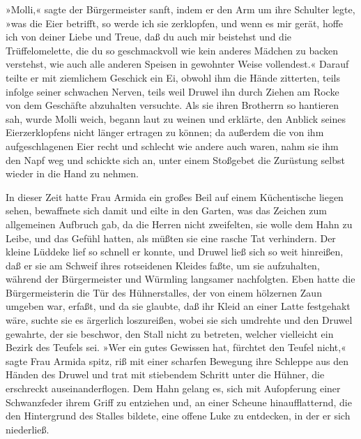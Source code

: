 »Molli,« sagte der Bürgermeister sanft, indem er den Arm um ihre
Schulter legte, »was die Eier betrifft, so werde ich sie
zerklopfen, und wenn es mir gerät, hoffe ich von deiner Liebe und
Treue, daß du auch mir beistehst und die Trüffelomelette, die du so
geschmackvoll wie kein anderes Mädchen zu backen verstehst, wie
auch alle anderen Speisen in gewohnter Weise vollendest.« Darauf
teilte er mit ziemlichem Geschick ein Ei, obwohl ihm die Hände
zitterten, teils infolge seiner schwachen Nerven, teils weil Druwel
ihn durch Ziehen am Rocke von dem Geschäfte abzuhalten versuchte.
Als sie ihren Brotherrn so hantieren sah, wurde Molli weich, begann
laut zu weinen und erklärte, den Anblick seines Eierzerklopfens
nicht länger ertragen zu können; da außerdem die von ihm
aufgeschlagenen Eier recht und schlecht wie andere auch waren, nahm
sie ihm den Napf weg und schickte sich an, unter einem Stoßgebet
die Zurüstung selbst wieder in die Hand zu nehmen.

In dieser Zeit hatte Frau Armida ein großes Beil auf einem
Küchentische liegen sehen, bewaffnete sich damit und eilte in den
Garten, was das Zeichen zum allgemeinen Aufbruch gab, da die Herren
nicht zweifelten, sie wolle dem Hahn zu Leibe, und das Gefühl
hatten, als müßten sie eine rasche Tat verhindern. Der kleine
Lüddeke lief so schnell er konnte, und Druwel ließ sich so weit
hinreißen, daß er sie am Schweif ihres rotseidenen Kleides faßte,
um sie\pagenum{[17]} aufzuhalten, während der Bürgermeister und
Würmling langsamer nachfolgten. Eben hatte die Bürgermeisterin die
Tür des Hühnerstalles, der von einem hölzernen Zaun umgeben war,
erfaßt, und da sie glaubte, daß ihr Kleid an einer Latte festgehakt
wäre, suchte sie es ärgerlich loszureißen, wobei sie sich umdrehte
und den Druwel gewahrte, der sie beschwor, den Stall nicht zu
betreten, welcher vielleicht ein Bezirk des Teufels sei. »Wer ein
gutes Gewissen hat, fürchtet den Teufel nicht,« sagte Frau Armida
spitz, riß mit einer scharfen Bewegung ihre Schleppe aus den Händen
des Druwel und trat mit stiebendem Schritt unter die Hühner, die
erschreckt auseinanderflogen. Dem Hahn gelang es, sich mit
Aufopferung einer Schwanzfeder ihrem Griff zu entziehen und, an
einer Scheune hinaufflatternd, die den Hintergrund des Stalles
bildete, eine offene Luke zu entdecken, in der er sich niederließ.

